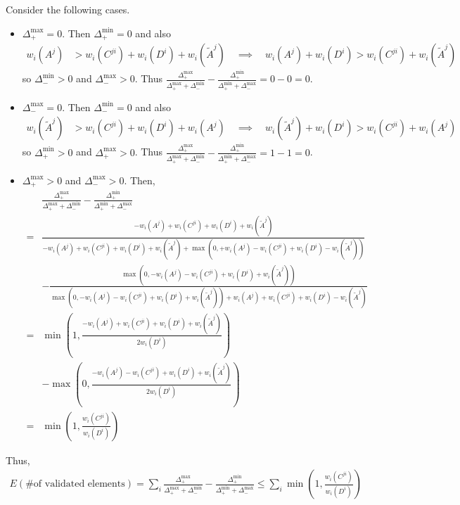 Consider the following cases.
\begin{itemize}
\item $\Delta_+^{\max} = 0$. Then $\Delta_+^{\min} = 0$ and also
\begin{align*}
w_i(A^j) &> w_i(C^{ji})+ w_i(D^i) + w_i(\tilde{A}^j)
\quad\implies\quad w_i(A^j) + w_i(D^i) > w_i(C^{ji}) + w_i(\tilde{A}^j)
\end{align*}
so $\Delta_-^{\min} > 0$ and $\Delta_-^{\max}>0$.
Thus $\frac{\Delta_+^{\max}}{\Delta_+^{\max} + \Delta_-^{\min}} - \frac{\Delta_+^{\min}}{\Delta_+^{\min} + \Delta_-^{\max}} = 0-0 = 0$.

\item $\Delta_-^{\max} = 0$. Then $\Delta_-^{\min} = 0$ and also
\begin{align*}
w_i(\tilde{A}^j) &> w_i(C^{ji})+ w_i(D^i) + w_i(A^j)
\quad\implies\quad w_i(\tilde{A}^j) + w_i(D^i) > w_i(C^{ji}) + w_i(A^j)
\end{align*}
so $\Delta_+^{\min} > 0$ and $\Delta_+^{\max} > 0$.
Thus $\frac{\Delta_+^{\max}}{\Delta_+^{\max} + \Delta_-^{\min}} - \frac{\Delta_+^{\min}}{\Delta_+^{\min} + \Delta_-^{\max}} = 1-1 = 0$.

\item $\Delta_+^{\max}>0$ and $\Delta_-^{\max}>0$.
Then,
\begin{align*}
&\frac{\Delta_+^{\max}}{\Delta_+^{\max} + \Delta_-^{\min}} - \frac{\Delta_+^{\min}}{\Delta_+^{\min} + \Delta_-^{\max}} \\
=& \frac{- w_i(A^j) + w_i(C^{ji}) + w_i(D^i) + w_i(\tilde{A}^j)}{- w_i(A^j) + w_i(C^{ji}) + w_i(D^i) + w_i(\tilde{A}^j) + \max(0, + w_i(A^j) - w_i(C^{ji}) + w_i(D^i) - w_i(\tilde{A}^j))}\\
 &- \frac{\max(0, - w_i(A^j) -w_i(C^{ji}) + w_i(D^i) + w_i(\tilde{A}^j))}{\max(0, - w_i(A^j) -w_i(C^{ji}) + w_i(D^i) + w_i(\tilde{A}^j)) + w_i(A^j) + w_i(C^{ji}) + w_i(D^i) - w_i(\tilde{A}^j)}\\
=& \min\left(1,\frac{ - w_i(A^j) + w_i(C^{ji}) + w_i(D^i) + w_i(\tilde{A}^j)}{2w_i(D^i)}\right)\\
 & -\max\left(0,\frac{- w_i(A^j) - w_i(C^{ji}) + w_i(D^i) + w_i(\tilde{A}^j)}{2w_i(D^i)}\right)\\
=& \min\left(1,\frac{ w_i(C^{ji})}{w_i(D^i)}\right)
\end{align*}
\end{itemize}

Thus,
\begin{align*}
E(\text{\# of validated elements})
= \sum_i\frac{\Delta_+^{\max}}{\Delta_+^{\max} + \Delta_-^{\min}} - \frac{\Delta_+^{\min}}{\Delta_+^{\min} + \Delta_-^{\max}}
\leq \sum_i \min\left(1,\frac{ w_i(C^{ji})}{w_i(D^i)}\right)
\end{align*}

